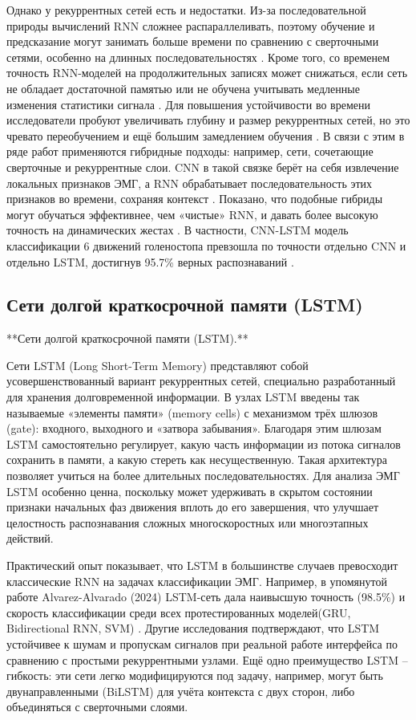 \documentclass[12pt,a4paper]{article}
\begin{document}
Однако у рекуррентных сетей есть и недостатки. Из-за последовательной природы вычислений RNN сложнее распараллеливать, поэтому обучение и предсказание могут занимать больше времени по сравнению с сверточными сетями, особенно на длинных последовательностях \cite{21}. Кроме того, со временем точность RNN-моделей на продолжительных записях может снижаться, если сеть не обладает достаточной памятью или не обучена учитывать медленные изменения статистики сигнала \cite{22}. Для повышения устойчивости во времени исследователи пробуют увеличивать глубину и размер рекуррентных сетей, но это чревато переобучением и ещё большим замедлением обучения \cite{23}. В связи с этим в ряде работ применяются гибридные подходы: например, сети, сочетающие сверточные и рекуррентные слои. CNN в такой связке берёт на себя извлечение локальных признаков ЭМГ, а RNN обрабатывает последовательность этих признаков во времени, сохраняя контекст \cite{24}. Показано, что подобные гибриды могут обучаться эффективнее, чем «чистые» RNN, и давать более высокую точность на динамических жестах \cite{25}. В частности, CNN-LSTM модель классификации 6 движений голеностопа превзошла по точности отдельно CNN и отдельно LSTM, достигнув 95.7\% верных распознаваний \cite{26}.


\subsection{Сети долгой краткосрочной памяти (LSTM)}
**Сети долгой краткосрочной памяти (LSTM).** 

Сети LSTM (Long Short-Term Memory) представляют собой усовершенствованный вариант рекуррентных сетей, специально разработанный для хранения долговременной информации. В узлах LSTM введены так называемые «элементы памяти» (memory cells) с механизмом трёх шлюзов (gate): входного, выходного и «затвора забывания». Благодаря этим шлюзам LSTM самостоятельно регулирует, какую часть информации из потока сигналов сохранить в памяти, а какую стереть как несущественную. Такая архитектура позволяет учиться на более длительных последовательностях. Для анализа ЭМГ LSTM особенно ценна, поскольку может удерживать в скрытом состоянии признаки начальных фаз движения вплоть до его завершения, что улучшает целостность распознавания сложных многоскоростных или многоэтапных действий.

Практический опыт показывает, что LSTM в большинстве случаев превосходит классические RNN на задачах классификации ЭМГ. Например, в упомянутой работе Alvarez-Alvarado (2024) LSTM-сеть дала наивысшую точность (98.5\%) и скорость классификации среди всех протестированных моделей(GRU, Bidirectional RNN, SVM) \cite{20}.  Другие исследования подтверждают, что LSTM устойчивее к шумам и пропускам сигналов при реальной работе интерфейса по сравнению с простыми рекуррентными узлами. Ещё одно преимущество LSTM – гибкость: эти сети легко модифицируются под задачу, например, могут быть двунаправленными (BiLSTM) для учёта контекста с двух сторон, либо объединяться с сверточными слоями. 
\end{document}
